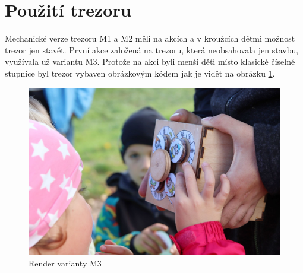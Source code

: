 \section{Použití trezoru}
Mechanické verze trezoru M1 a M2 měli na akcích a v kroužcích dětmi možnost trezor jen stavět. První akce založená na trezoru, která neobsahovala jen stavbu, využívala už variantu M3.
Protože na akci byli menší děti místo klasické číselné stupnice byl trezor vybaven obrázkovým kódem jak je vidět na obrázku \ref{fig:M3-trpaslici}.

\begin{figure}[htbp]
    \centering
    \includegraphics[width=\textwidth]{kapitoly/obrazky/M3/trpaslici.png}
    \caption{Render varianty M3}
    \label{fig:M3-trpaslici}
\end{figure}
